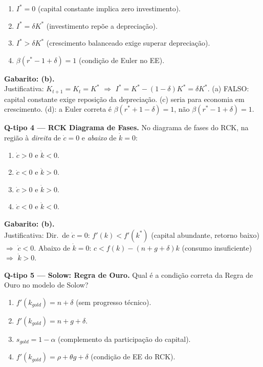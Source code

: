 \documentclass[12pt, a4paper]{article}
\begin{document}
\begin{enumerate}[label=(\alph*)]
\item $I^* = 0$ (capital constante implica zero investimento).
\item $I^* = \delta K^*$ (investimento repõe a depreciação).
\item $I^* > \delta K^*$ (crescimento balanceado exige superar depreciação).
\item $\beta(r^* - 1 + \delta) = 1$ (condição de Euler no EE).
\end{enumerate}

\textbf{Gabarito: (b).}\\
Justificativa: $K_{t+1} = K_t = K^*$ $\Rightarrow$ $I^* = K^* - (1-\delta)K^* = \delta K^*$. (a) FALSO: capital constante exige reposição da depreciação. (c) seria para economia em crescimento. (d): a Euler correta é $\beta(r^*+1-\delta)=1$, não $\beta(r^*-1+\delta)=1$.

\medskip
\textbf{Q-tipo 4 --- RCK Diagrama de Fases.} No diagrama de fases do RCK, na região à \emph{direita} de $\dot{c}=0$ e \emph{abaixo} de $\dot{k}=0$:

\begin{enumerate}[label=(\alph*)]
\item $\dot{c}>0$ e $\dot{k}<0$.
\item $\dot{c}<0$ e $\dot{k}>0$.
\item $\dot{c}>0$ e $\dot{k}>0$.
\item $\dot{c}<0$ e $\dot{k}<0$.
\end{enumerate}

\textbf{Gabarito: (b).}\\
Justificativa: Dir.\ de $\dot{c}=0$: $f'(k) < f'(k^*)$ (capital abundante, retorno baixo) $\Rightarrow$ $\dot{c}<0$. Abaixo de $\dot{k}=0$: $c < f(k)-(n+g+\delta)k$ (consumo insuficiente) $\Rightarrow$ $\dot{k}>0$.

\medskip
\textbf{Q-tipo 5 --- Solow: Regra de Ouro.} Qual é a condição correta da Regra de Ouro no modelo de Solow?

\begin{enumerate}[label=(\alph*)]
\item $f'(k_{gold}) = n+\delta$ (sem progresso técnico).
\item $f'(k_{gold}) = n+g+\delta$.
\item $s_{gold} = 1-\alpha$ (complemento da participação do capital).
\item $f'(k_{gold}) = \rho+\theta g+\delta$ (condição de EE do RCK).
\end{enumerate}
\end{document}
